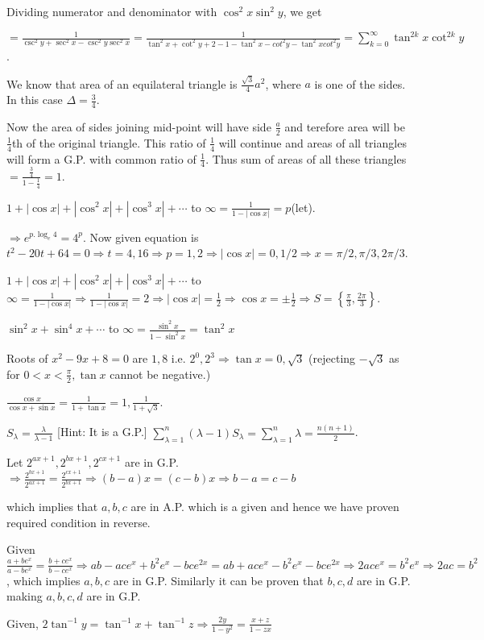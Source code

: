   Dividing numerator and denominator with $\cos^2x\sin^2y$, we get

  $= \frac{1}{\csc^2y + \sec^2x - \csc^2y\sec^2x} = \frac{1}{\tan^2x + \cot^2y + 2 - 1 -\tan^2x - cot^2y
    - \tan^2xcot^2y} = \displaystyle\sum_{k = 0}^{\infty}\tan^{2k}x\cot^{2k}y$.
\item We know that area of an equilateral triangle is $\frac{\sqrt{3}}{4}a^2$, where $a$ is one of the
  sides. In this case $\Delta = \frac{3}{4}$.

  Now the area of sides joining mid-point will have side $\frac{a}{2}$ and terefore area will be
  $\frac{1}{4}$th of the original triangle. This ratio of $\frac{1}{4}$ will continue and areas of all
  triangles will form a G.P. with common ratio of $\frac{1}{4}$. Thus sum of areas of all these triangles $=
  \frac{\tfrac{3}{4}}{1 - \tfrac{1}{4}} = 1$.
\item $1 + |\cos x| + |\cos^2x| + |\cos^3x| + \cdots$ to $\infty = \frac{1}{1 - |\cos x|} = p$(let).

  $\Rightarrow e^{p.\log_e4} = 4^p$. Now given equation is $t^2 - 20t + 64 = 0 \Rightarrow t = 4, 16
  \Rightarrow p = 1, 2 \Rightarrow |\cos x| = 0, 1/2 \Rightarrow x = \pi/2, \pi/3, 2\pi/3$.
\item $1 + |\cos x| + |\cos^2x| + |\cos^3x| + \cdots$ to $\infty = \frac{1}{1 - |\cos x|} \Rightarrow
  \frac{1}{1 - |\cos x|} = 2 \Rightarrow |\cos x| = \frac{1}{2}\Rightarrow \cos x = \pm\frac{1}{2}
  \Rightarrow S = \left\{\frac{\pi}{3}, \frac{2\pi}{3}\right\}$.
\item $\sin^2x + \sin^4x + \cdots$ to $\infty = \frac{\sin^2x}{1 - \sin^2x} = \tan^2x$

  Roots of $x^2 - 9x + 8 = 0$ are $1, 8$ i.e. $2^0, 2^3 \Rightarrow \tan x = 0, \sqrt{3}$ (rejecting
  $-\sqrt{3}$ as for $0< x< \frac{\pi}{2}, \tan x$  cannot be negative.)

  $\frac{\cos x}{\cos x + \sin x} = \frac{1}{1 + \tan x} = 1, \frac{1}{1 + \sqrt{3}}$.
\item $S_\lambda = \frac{\lambda}{\lambda - 1}$ [Hint: It is a G.P.]
  $\displaystyle\sum_{\lambda=1}^n(\lambda - 1)S_\lambda = \sum_{\lambda=1}^n\lambda = \frac{n(n + 1)}{2}$.
\item Let $2^{ax + 1}, 2^{bx + 1}, 2^{cx + 1}$ are in G.P. $\Rightarrow \frac{2^{bx + 1}}{2^{ax + 1}} =
  \frac{2^{cx + 1}}{2^{bx + 1}} \Rightarrow (b - a)x = (c - b)x \Rightarrow b - a = c - b$

  which implies that $a, b, c$ are in A.P. which is a given and hence we have proven required condition in
  reverse.
\item Given $\frac{a + be^x}{a - be^x} = \frac{b + ce^x}{b - ce^x} \Rightarrow ab - ace^x + b^2e^x -
  bce^{2x} = ab + ace^x - b^2e^x - bce^{2x} \Rightarrow 2ace^x = b^2e^x \Rightarrow 2ac = b^2$, which
  implies $a, b, c$ are in G.P. Similarly it can be proven that $b, c, d$ are in G.P. making $a, b, c, d$
  are in G.P.
\item Given, $2\tan^{-1}y = \tan^{-1}x + \tan^{-1}z \Rightarrow \frac{2y}{1 - y^2} = \frac{x + z}{1 - zx}$

